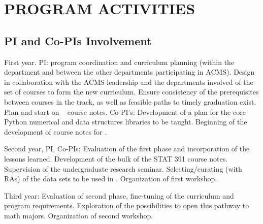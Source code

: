 \section{PROGRAM ACTIVITIES}
\label{sec:activities}

\subsection{PI and Co-PIs Involvement}

\bits
\item First year. PI: program coordination and curriculum planning (within the department and between the other departments participating in ACMS). Design in collaboration with the ACMS leadership and the departments involved of the set of courses to form the new curriculum. Ensure consistency of the prerequisites between courses in the track, as well as feasible paths to timely graduation exist. Plan and start on \statcl~ course notes. Co-PI's: Development of a plan for the core Python numerical and data structures libraries to be taught.
Beginning of the development of course notes for \statcl.
\item Second year, PI, Co-PIs: Evaluation of the first phase and
  incorporation of the lessons learned. Development of the bulk of the
  STAT 391 course notes. Supervision of the undergraduate research
  seminar.  Selecting/curating (with RAs) of the data sets to be used
  in \statcl. Organization of first workshop.
\item Third year: Evaluation of second phase, fine-tuning of the
  curriculum and program requirements. Exploration of the
  possibilities to open this pathway to math majors. Organization of
  second workshop.  \eits

